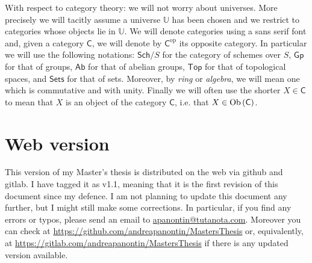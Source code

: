 With respect to category theory:
we will not worry about universes. More precisely we will
tacitly assume a universe $\mathbb{U}$ has been chosen
and we restrict to categories whose objects lie in $\mathbb{U}$.
We will denote categories using a sans serif font and, given a category \(\mathsf{C}\),
we will denote by \(\mathsf{C}^{\mathrm{op}}\) its opposite category.
In particular we will use the following notations:
$\mathsf{Sch}/S$ for the category of schemes over $S$,
$\mathsf{Gp}$ for that of groups,
$\mathsf{Ab}$ for that of abelian groups,
$\mathsf{Top}$ for that of topological spaces,
and $\mathsf{Sets}$ for that of sets.
Moreover, by \emph{ring} or \emph{algebra}, we will mean one which is commutative and with unity.
Finally we will often use the shorter $X \in \mathsf{C}$ to mean that $X$ is an object
of the category $\mathsf{C}$, i.e. that $X \in \operatorname{Ob} \left(\mathsf{C}\right)$.



\section*{Web version}
This version of my Master's thesis is distributed on the web via github and gitlab.
I have tagged it as v1.1, meaning that it is the first revision of this document since
my defence.
I am not planning to update this document any further, but I might still make some corrections.
In particular, if you find any errors or typos, please send an email to
\href{mailto:apanontin@tutanota.com}{apanontin@tutanota.com}.
Moreover you can check at \url{https://github.com/andreapanontin/MastersThesis} or, equivalently,
at \url{https://gitlab.com/andreapanontin/MastersThesis}
if there is any updated version available.
